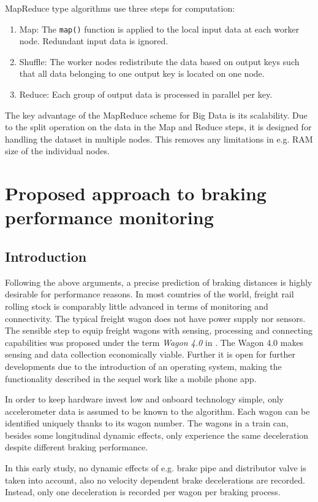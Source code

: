 \documentclass[a4paper, 12pt]{scrartcl}
\begin{document}
MapReduce type algorithms use three steps for computation:
\begin{enumerate}
	\item Map: The \texttt{map()} function is applied to the local input data at each worker node. Redundant input data is ignored.
	\item Shuffle: The worker nodes redistribute the data based on output keys such that all data belonging to one output key is located on one node.
	\item Reduce: Each group of output data is processed in parallel per key. 
\end{enumerate}

The key advantage of the MapReduce scheme for Big Data is its scalability. Due to the split operation on the data in the Map and Reduce steps, it is designed for handling the dataset in multiple nodes. This removes any limitations in e.g. RAM size of the individual nodes.

\section{Proposed approach to braking performance monitoring}
\subsection{Introduction}
Following the above arguments, a precise prediction of braking distances is highly desirable for performance reasons. In most countries of the world, freight rail rolling stock is comparably little advanced in terms of monitoring and connectivity. The typical freight wagon does not have power supply nor sensors. The sensible step to equip freight wagons with sensing, processing and connecting capabilities was proposed under the term \textit{Wagon 4.0} in \cite{pfaff2017stephenson}. The Wagon 4.0 makes sensing and data collection economically viable. Further it is open for further developments due to the introduction of an operating system, making the functionality described in the sequel work like a mobile phone app.

In order to keep hardware invest low and onboard technology simple, only accelerometer data is assumed to be known to the algorithm. Each wagon can be identified uniquely thanks to its wagon number. The wagons in a train can, besides some longitudinal dynamic effects, only experience the same deceleration despite different braking performance.

In this early study, no dynamic effects of e.g. brake pipe and distributor valve is taken into account, also no velocity dependent brake decelerations are recorded. Instead, only one deceleration is recorded per wagon per braking process.
\end{document}
